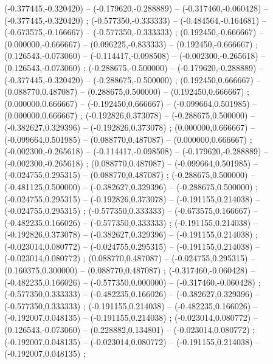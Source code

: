    (-0.377445,-0.320420) -- (-0.179620,-0.288889) -- (-0.317460,-0.060428) -- (-0.377445,-0.320420) ;
   (-0.577350,-0.333333) -- (-0.484564,-0.164681) -- (-0.673575,-0.166667) -- (-0.577350,-0.333333) ;
   (0.192450,-0.666667) -- (0.000000,-0.666667) -- (0.096225,-0.833333) -- (0.192450,-0.666667) ;
   (0.126543,-0.073060) -- (-0.114417,-0.098508) -- (-0.002300,-0.265618) -- (0.126543,-0.073060) ;
   (-0.288675,-0.500000) -- (-0.179620,-0.288889) -- (-0.377445,-0.320420) -- (-0.288675,-0.500000) ;
   (0.192450,0.666667) -- (0.088770,0.487087) -- (0.288675,0.500000) -- (0.192450,0.666667) ;
   (0.000000,0.666667) -- (-0.192450,0.666667) -- (-0.099664,0.501985) -- (0.000000,0.666667) ;
   (-0.192826,0.373078) -- (-0.288675,0.500000) -- (-0.382627,0.329396) -- (-0.192826,0.373078) ;
   (0.000000,0.666667) -- (-0.099664,0.501985) -- (0.088770,0.487087) -- (0.000000,0.666667) ;
   (-0.002300,-0.265618) -- (-0.114417,-0.098508) -- (-0.179620,-0.288889) -- (-0.002300,-0.265618) ;
   (0.088770,0.487087) -- (-0.099664,0.501985) -- (-0.024755,0.295315) -- (0.088770,0.487087) ;
   (-0.288675,0.500000) -- (-0.481125,0.500000) -- (-0.382627,0.329396) -- (-0.288675,0.500000) ;
   (-0.024755,0.295315) -- (-0.192826,0.373078) -- (-0.191155,0.214038) -- (-0.024755,0.295315) ;
   (-0.577350,0.333333) -- (-0.673575,0.166667) -- (-0.482235,0.166026) -- (-0.577350,0.333333) ;
   (-0.191155,0.214038) -- (-0.192826,0.373078) -- (-0.382627,0.329396) -- (-0.191155,0.214038) ;
   (-0.023014,0.080772) -- (-0.024755,0.295315) -- (-0.191155,0.214038) -- (-0.023014,0.080772) ;
   (0.088770,0.487087) -- (-0.024755,0.295315) -- (0.160375,0.300000) -- (0.088770,0.487087) ;
   (-0.317460,-0.060428) -- (-0.482235,0.166026) -- (-0.577350,0.000000) -- (-0.317460,-0.060428) ;
   (-0.577350,0.333333) -- (-0.482235,0.166026) -- (-0.382627,0.329396) -- (-0.577350,0.333333) ;
   (-0.191155,0.214038) -- (-0.482235,0.166026) -- (-0.192007,0.048135) -- (-0.191155,0.214038) ;
   (-0.023014,0.080772) -- (0.126543,-0.073060) -- (0.228882,0.134801) -- (-0.023014,0.080772) ;
   (-0.192007,0.048135) -- (-0.023014,0.080772) -- (-0.191155,0.214038) -- (-0.192007,0.048135) ;
